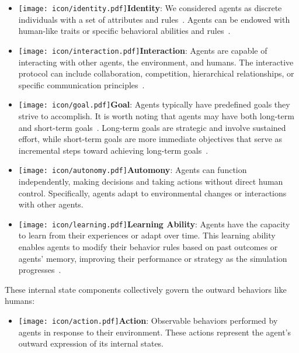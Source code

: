 \begin{itemize}
\item {\texttt{[image: icon/identity.pdf]}\textbf{Identity}}: We considered agents as discrete individuals with a set of attributes and rules~\cite{10.1145/3626772.3657844}. 
Agents can be endowed with human-like traits or specific behavioral abilities and rules~\cite{wang2024userbehaviorsimulationlarge}.

\item {\texttt{[image: icon/interaction.pdf]}\textbf{Interaction}}: Agents are capable of interacting with other agents, the environment, and humans.
The interactive protocol can include collaboration, competition, hierarchical relationships, or specific communication principles~\cite{hua2024warpeacewaragentlarge,pan2024agentcoordvisuallyexploringcoordination}.

\item {\texttt{[image: icon/goal.pdf]}\textbf{Goal}}: Agents typically have predefined goals they strive to accomplish. 
It is worth noting that agents may have both long-term~\cite{NEURIPS2023_5950bf29, NEURIPS2023_a3621ee9} and short-term goals~\cite{pan2024agentcoordvisuallyexploringcoordination}.
Long-term goals are strategic and involve sustained effort, while short-term goals are more immediate objectives that serve as incremental steps toward achieving long-term goals~\cite{shridhar2020alfredbenchmarkinterpretinggrounded}.

\item {\texttt{[image: icon/autonomy.pdf]}\textbf{Automony}}: Agents can function independently, making decisions and taking actions without direct human control. 
Specifically, agents adapt to environmental changes or interactions with other agents.

\item {\texttt{[image: icon/learning.pdf]}\textbf{Learning Ability}}: Agents have the capacity to learn from their experiences or adapt over time.
This learning ability enables agents to modify their behavior rules based on past outcomes or agents' memory, improving their performance or strategy as the simulation progresses~\cite{cui2024chatlawmultiagentcollaborativelegal,doi:10.1073/pnas.2115730119}.

\end{itemize}

These internal state components collectively govern the outward behaviors like humans:
\begin{itemize}
    \item {\texttt{[image: icon/action.pdf]}\textbf{Action}}: Observable behaviors performed by agents in response to their environment.
    These actions represent the agent's outward expression of its internal states.
\end{itemize}

